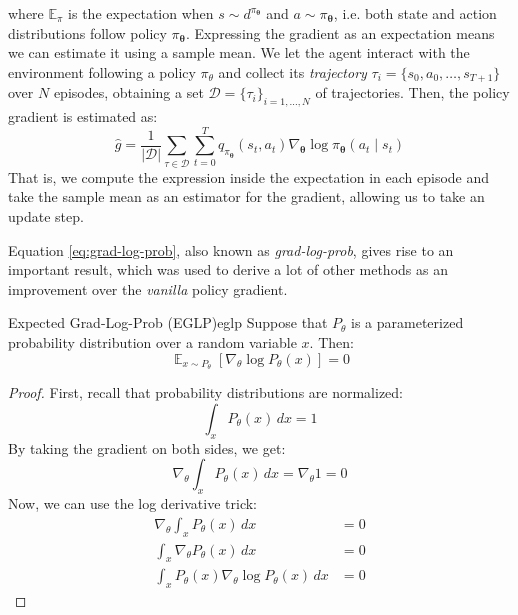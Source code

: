 where $\mathbb{E}_\pi$ is the expectation when $s \sim d^{\pi_{\boldsymbol\theta}}$ and $a \sim \pi_{\boldsymbol\theta}$, i.e. both state and action distributions follow policy $\pi_{\boldsymbol\theta}$. Expressing the gradient as an expectation means we can estimate it using a sample mean. We let the agent interact with the environment following a policy $\pi_\theta$ and collect its \textit{trajectory} $\tau_i = \{s_0, a_0, \dots, s_{T+1}\}$ over $N$ episodes, obtaining a set $\mathcal{D} = \{\tau_i\}_{i=1,\dots,N}$ of trajectories. Then, the policy gradient is estimated as:
\begin{equation}\label{pg_estimator}
    \hat{g} = \frac{1}{|\mathcal{D}|}\sum_{\tau \in \mathcal{D}} \sum_{t=0}^{T} q_{\pi_{\boldsymbol\theta}}(s_t, a_t)\nabla_{\boldsymbol\theta}\log{\pi_{\boldsymbol\theta}(a_t \mid s_t)}
\end{equation}
That is, we compute the expression inside the expectation in each episode and take the sample mean as an estimator for the gradient, allowing us to take an update step.

Equation \ref{eq:grad-log-prob}, also known as \textit{grad-log-prob}, gives rise to an important result, which was used to derive a lot of other methods as an improvement over the \textit{vanilla} policy gradient.
\begin{lemma}{Expected Grad-Log-Prob (EGLP)}{eglp}
    Suppose that $P_\theta$ is a parameterized probability distribution over a random variable $x$. Then:
    \begin{equation}
        \mathop{\mathbb{E}}_{x \sim P_\theta}\left[\nabla_\theta \log{P_\theta(x)}\right] = 0
    \end{equation}
\end{lemma}
\begin{proof}
    First, recall that probability distributions are normalized:
    \begin{equation}
        \int_x P_\theta(x) \,dx = 1
    \end{equation}
    By taking the gradient on both sides, we get:
    \begin{equation}
        \nabla_\theta\int_x P_\theta(x) \,dx = \nabla_\theta 1 = 0
    \end{equation}
    Now, we can use the log derivative trick:
    \begin{align}
        \nabla_\theta\int_x P_\theta(x) \,dx &= 0 \nonumber\\
        \int_x \nabla_\theta P_\theta(x) \,dx &= 0 \\
        \int_x P_\theta(x) \nabla_\theta\log{P_\theta(x)} \,dx &= 0 \nonumber
    \end{align}
\end{proof}

